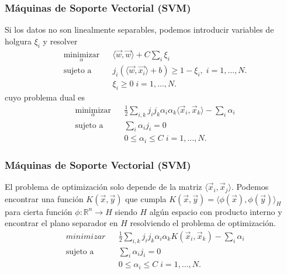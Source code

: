 \documentclass{beamer}
\begin{document}
\begin{frame}
\frametitle{Máquinas de Soporte Vectorial (SVM)}
Si los datos no son linealmente separables, podemos introducir variables de holgura $\xi_i$ y resolver
\begin{equation*}
\begin{aligned}
& \underset{\alpha}{\text{minimizar}}
& & \langle \vec{w}, \vec{w}\rangle + C\sum_i\xi_i  \\
& \text{sujeto a}
& & j_i(\langle \vec{w}, \vec{x_i}\rangle + b)\geq 1-\xi_i, \; i = 1, \ldots, N.\\
& & & \xi_i\geq 0 \; i = 1, \ldots, N.
\end{aligned}
\end{equation*} 
cuyo problema dual es
\begin{equation*}
\begin{aligned}
& \underset{\alpha}{\text{minimizar}}
& & \frac{1}{2} \sum_{i,k} j_{i}j_{k}\alpha_{i}\alpha_{k}\langle \vec{x}_{i}, \vec{x}_{k}\rangle - \sum_{i} \alpha_{i}  \\
& \text{sujeto a}
& & \sum_{i}\alpha_{i} j_{i} = 0\\
& & & 0\leq\alpha_i\leq C \; i = 1, \ldots, N.
\end{aligned}
\end{equation*}
\end{frame} 


\begin{frame}
\frametitle{Máquinas de Soporte Vectorial (SVM)}
El problema de optimización solo depende de la matriz $\langle \vec{x}_i, \vec{x}_j\rangle$. Podemos encontrar una función $K(\vec{x}, \vec{y})$ que cumpla $K(\vec{x}, \vec{y}) = \langle \phi(\vec{x}) , \phi(\vec{y})\rangle_{H}$ para cierta función $\phi:\mathbb{R}^n\rightarrow H$ siendo $H$ algún espacio con producto interno y encontrar el plano separador en $H$ resolviendo el problema de optimización.
\begin{equation*}
\begin{aligned}
& minimizar
& & \frac{1}{2} \sum_{i,k} j_{i}j_{k}\alpha_{i}\alpha_{k}K( \vec{x}_{i}, \vec{x}_{k}) - \sum_{i} \alpha_{i}  \\
& \text{sujeto a}
& & \sum_{i}\alpha_{i} j_{i} = 0\\
& & & 0\leq\alpha_i\leq C \; i = 1, \ldots, N.
\end{aligned}
\end{equation*}
\end{frame}
\end{document}
